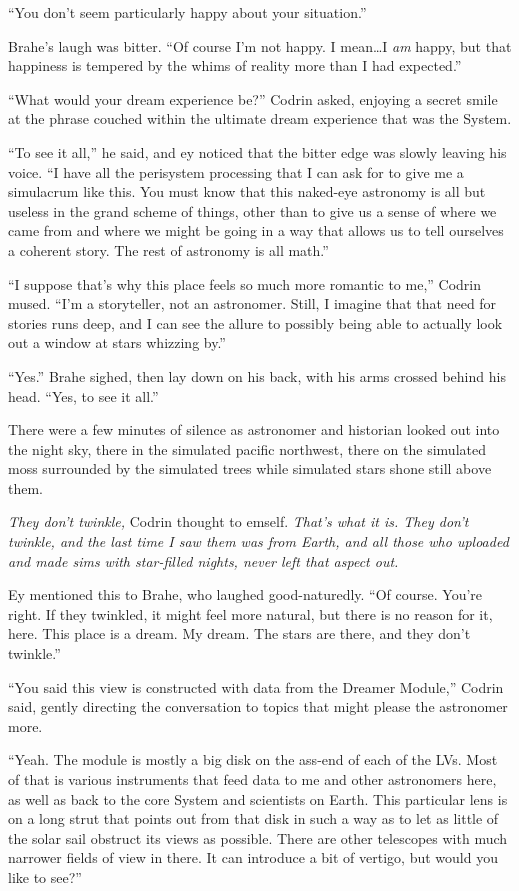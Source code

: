 ``You don't seem particularly happy about your situation.''

Brahe's laugh was bitter. ``Of course I'm not happy. I mean\ldots I \emph{am} happy, but that happiness is tempered by the whims of reality more than I had expected.''

``What would your dream experience be?'' Codrin asked, enjoying a secret smile at the phrase couched within the ultimate dream experience that was the System.

``To see it all,'' he said, and ey noticed that the bitter edge was slowly leaving his voice. ``I have all the perisystem processing that I can ask for to give me a simulacrum like this. You must know that this naked-eye astronomy is all but useless in the grand scheme of things, other than to give us a sense of where we came from and where we might be going in a way that allows us to tell ourselves a coherent story. The rest of astronomy is all math.''

``I suppose that's why this place feels so much more romantic to me,'' Codrin mused. ``I'm a storyteller, not an astronomer. Still, I imagine that that need for stories runs deep, and I can see the allure to possibly being able to actually look out a window at stars whizzing by.''

``Yes.'' Brahe sighed, then lay down on his back, with his arms crossed behind his head. ``Yes, to see it all.''

There were a few minutes of silence as astronomer and historian looked out into the night sky, there in the simulated pacific northwest, there on the simulated moss surrounded by the simulated trees while simulated stars shone still above them.

\emph{They don't twinkle,} Codrin thought to emself. \emph{That's what it is. They don't twinkle, and the last time I saw them was from Earth, and all those who uploaded and made sims with star-filled nights, never left that aspect out.}

Ey mentioned this to Brahe, who laughed good-naturedly. ``Of course. You're right. If they twinkled, it might feel more natural, but there is no reason for it, here. This place is a dream. My dream. The stars are there, and they don't twinkle.''

``You said this view is constructed with data from the Dreamer Module,'' Codrin said, gently directing the conversation to topics that might please the astronomer more.

``Yeah. The module is mostly a big disk on the ass-end of each of the LVs. Most of that is various instruments that feed data to me and other astronomers here, as well as back to the core System and scientists on Earth. This particular lens is on a long strut that points out from that disk in such a way as to let as little of the solar sail obstruct its views as possible. There are other telescopes with much narrower fields of view in there. It can introduce a bit of vertigo, but would you like to see?''

